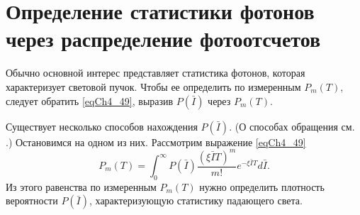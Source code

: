 \section{Определение статистики фотонов через распределение
  фотоотсчетов}
Обычно основной интерес представляет статистика фотонов, которая
характеризует световой пучок. Чтобы ее определить по измеренным
$P_m\left(T\right)$, следует обратить \eqref{eqCh4_49}, выразив
$P\left(\bar{I}\right)$ через $P_m\left(T\right)$. 
   
Существует несколько способов нахождения $P\left(\bar{I}\right)$.  (О
способах обращения см. \cite{bDvait1973}.) Остановимся на одном
из них.  Рассмотрим выражение \eqref{eqCh4_49}
\[
P_m\left(T\right) = 
\int_0^{\infty}
P\left(\bar{I}\right)
\frac{\left(\xi \bar{I}T\right)^m}{m!} e^{-
  \xi \bar{I} T} 
d \bar{I}.
\]
Из этого равенства по измеренным $P_m\left(T\right)$ нужно определить
плотность вероятности  $P\left(\bar{I}\right)$,  характеризующую
статистику падающего света.   

